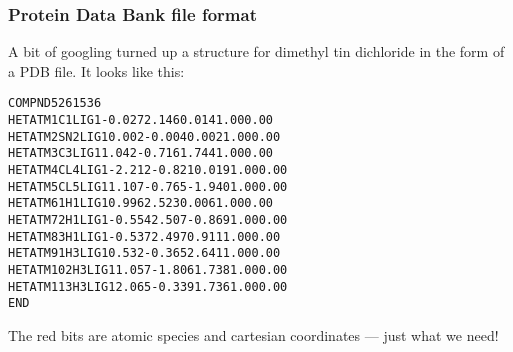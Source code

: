 
\begin{frame}[fragile]
  \frametitle{Protein Data Bank file format}
  A bit of googling turned up a structure for dimethyl tin dichloride
  in the form of a PDB file.  It looks like this:

  \begin{block}{}
\begin{alltt}
\scriptsize
COMPND    5261536
HETATM    1 \alert{ C}1  LIG     1      \alert{-0.027   2.146   0.014}  1.00  0.00
HETATM    2 \alert{SN}2  LIG     1      \alert{ 0.002  -0.004   0.002}  1.00  0.00
HETATM    3 \alert{ C}3  LIG     1      \alert{ 1.042  -0.716   1.744}  1.00  0.00
HETATM    4 \alert{CL}4  LIG     1      \alert{-2.212  -0.821   0.019}  1.00  0.00
HETATM    5 \alert{CL}5  LIG     1      \alert{ 1.107  -0.765  -1.940}  1.00  0.00
HETATM    6 1\alert{H}1  LIG     1      \alert{ 0.996   2.523   0.006}  1.00  0.00
HETATM    7 2\alert{H}1  LIG     1      \alert{-0.554   2.507  -0.869}  1.00  0.00
HETATM    8 3\alert{H}1  LIG     1      \alert{-0.537   2.497   0.911}  1.00  0.00
HETATM    9 1\alert{H}3  LIG     1      \alert{ 0.532  -0.365   2.641}  1.00  0.00
HETATM   10 2\alert{H}3  LIG     1      \alert{ 1.057  -1.806   1.738}  1.00  0.00
HETATM   11 3\alert{H}3  LIG     1      \alert{ 2.065  -0.339   1.736}  1.00  0.00
END
\end{alltt}
  \end{block}

The \alert{red bits} are atomic species and cartesian coordinates ---
just what we need!
\end{frame}

